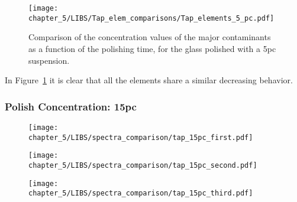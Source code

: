     \vspace*{-20pt}
 \begin{figure}[H]
    \centering
    \texttt{[image: chapter\_5/LIBS/Tap\_elem\_comparisons/Tap\_elements\_5\_pc.pdf]} 
    \vspace*{-30pt}
    \caption{Comparison of the concentration values of the major contaminants as a function of the polishing time, for the glass polished with a 5pc suspension.}
    \label{fig:tap_elem_5pc}
 \end{figure}
 In Figure~\ref{fig:tap_elem_5pc} it is clear that all the elements share a similar decreasing behavior.





\pagebreak



\subsubsection{Polish Concentration: 15pc}
\label{subsubsec:15pc}
\vspace*{-25pt}
\begin{figure}[H]
    \centering
    \texttt{[image: chapter\_5/LIBS/spectra\_comparison/tap\_15pc\_first.pdf]} 
 \end{figure}

\vspace*{-68pt}
\begin{figure}[H]
    \centering
    \texttt{[image: chapter\_5/LIBS/spectra\_comparison/tap\_15pc\_second.pdf]} 
 \end{figure}

\vspace*{-68pt}
\begin{figure}[H]
    \centering
    \texttt{[image: chapter\_5/LIBS/spectra\_comparison/tap\_15pc\_third.pdf]} 
 \end{figure}

